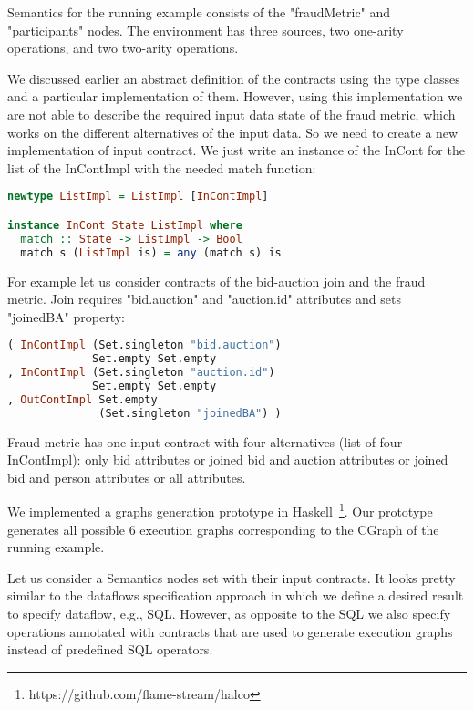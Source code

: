 Semantics for the running example consists of the "fraudMetric" and "participants" nodes.
The environment has three sources, two one-arity operations, and two two-arity operations.

We discussed earlier an abstract definition of the contracts using the type classes and a particular implementation of them. 
However, using this implementation we are not able to describe the required input data state of the fraud metric, which works on the different alternatives of the input data.
So we need to create a new implementation of input contract.
We just write an instance of the InCont for the list of the InContImpl with the needed match function:

\begin{lstlisting}[language=Haskell]
newtype ListImpl = ListImpl [InContImpl]

instance InCont State ListImpl where
  match :: State -> ListImpl -> Bool
  match s (ListImpl is) = any (match s) is
\end{lstlisting}

For example let us consider contracts of the bid-auction join and the fraud metric.
Join requires "bid.auction" and "auction.id" attributes and sets "joinedBA" property:
\begin{lstlisting}[language=Haskell]
( InContImpl (Set.singleton "bid.auction")
             Set.empty Set.empty
, InContImpl (Set.singleton "auction.id")
             Set.empty Set.empty
, OutContImpl Set.empty
              (Set.singleton "joinedBA") )
\end{lstlisting}

Fraud metric has one input contract with four alternatives (list of four InContImpl):
only bid attributes
or joined bid and auction attributes
or joined bid and person attributes
or all attributes.

We implemented a graphs generation prototype in Haskell~\footnote{https://github.com/flame-stream/halco}.
Our prototype generates all possible 6 execution graphs corresponding to the CGraph of the running example.

Let us consider a Semantics nodes set with their input contracts.
It looks pretty similar to the dataflows specification approach in which we define a desired result to specify dataflow, e.g., SQL.
However, as opposite to the SQL we also specify operations annotated with contracts that are used to generate execution graphs instead of predefined SQL operators.
